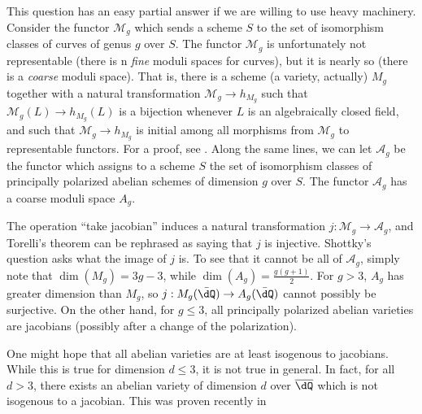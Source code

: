 \documentclass{article}
\begin{document}
This question has an easy partial answer if we are willing to use heavy 
machinery. Consider the functor $\mathcal{M}_g$ which sends a scheme $S$ to the 
set of isomorphism classes of curves of genus $g$ over $S$. The functor 
$\mathcal{M}_g$ is unfortunately not representable (there is n 
\emph{fine} moduli spaces for curves), but it is nearly so (there is a 
\emph{coarse} moduli space). That is, there is a scheme (a variety, 
actually) $M_g$ together with a natural transformation 
$\mathcal{M}_g\to h_{M_g}$ such that $\mathcal{M}_g(L)\to h_{M_g}(L)$ is a 
bijection whenever $L$ is an algebraically closed field, and such that 
$\mathcal{M}_g\to h_{M_g}$ is initial among all morphisms from $\mathcal{M}_g$ 
to representable functors. For a proof, see \cite[5]{mu94}. Along the same lines, 
we can let $\mathcal{A}_g$ be the functor which assigns to a scheme $S$ the set 
of isomorphism classes of principally polarized abelian schemes of dimension 
$g$ over $S$. The functor $\mathcal{A}_g$ has a coarse moduli space $A_g$. 

The operation ``take jacobian'' induces a natural transformation 
$j:\mathcal{M}_g\to\mathcal{A}_g$, and Torelli's theorem can be rephrased as 
saying that $j$ is injective. Shottky's question asks what the image of $j$ is. 
To see that it cannot be all of $\mathcal{A}_g$, simply note that 
$\dim(M_g) = 3 g - 3$, while $\dim(A_g) = \frac{g(g+1)}{2}$. For 
$g>3$, $A_g$ has greater dimension than $M_g$, so 
$j:M_g(\bar\dQ)\to A_g(\bar\dQ)$ cannot possibly be surjective. On the other 
hand, for $g\leqslant 3$, all principally polarized abelian varieties are 
jacobians (possibly after a change of the polarization). 

One might hope that all abelian varieties are at least isogenous to jacobians. 
While this is true for dimension $d\leqslant 3$, it is not true in general. 
In fact, for all $d>3$, there exists an abelian variety of dimension $d$ over 
$\overline{\dQ}$ which is not isogenous to a jacobian. This was proven 
recently in \cite{ts12}
\end{document}
